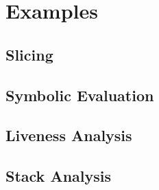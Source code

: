 \section{Examples}
\label{sec:examples}

\subsection{Slicing}

\subsection{Symbolic Evaluation}

\subsection{Liveness Analysis}

\subsection{Stack Analysis}
